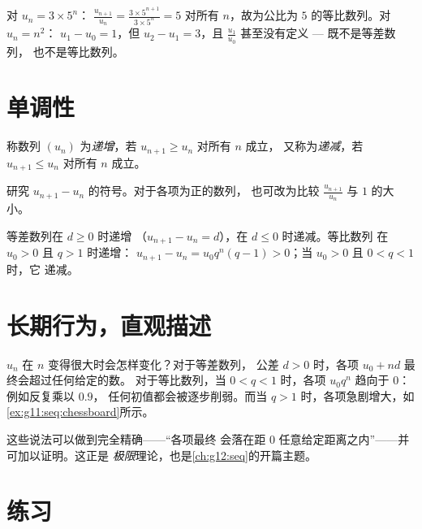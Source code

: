 \begin{example}
对 $u_n = 3 \times 5^n$：
$\frac{u_{n+1}}{u_n} = \frac{3 \times 5^{n+1}}{3 \times 5^n} = 5$ 对所有
$n$，故为公比为 $5$ 的等比数列。对 $u_n = n^2$：
$u_1 - u_0 = 1$，但 $u_2 - u_1 = 3$，且
$\frac{u_1}{u_0}$ 甚至没有定义 --- 既不是等差数列，
也不是等比数列。
\end{example}

\section{单调性}

\begin{definition}[单调数列]\label{def:g11:seq:monotone}
称数列 $(u_n)$ 为\emph{递增}，若 $u_{n+1} \geq u_n$ 对所有 $n$ 成立，
又称为\emph{递减}，若 $u_{n+1} \leq u_n$ 对所有 $n$ 成立。
\end{definition}

\begin{method}[研究单调性]\label{met:g11:seq:monotonicity}
研究 $u_{n+1} - u_n$ 的符号。对于各项为正的数列，
也可改为比较 $\frac{u_{n+1}}{u_n}$ 与 $1$ 的大小。
\end{method}

\begin{example}
等差数列在 $d \geq 0$ 时递增
（$u_{n+1} - u_n = d$），在 $d \leq 0$ 时递减。等比数列
在 $u_0 > 0$ 且 $q > 1$ 时递增：
$u_{n+1} - u_n = u_0 q^n (q - 1) > 0$；当 $u_0 > 0$ 且 $0 < q < 1$ 时，它
递减。
\end{example}

\section{长期行为，直观描述}

$u_n$ 在 $n$ 变得很大时会怎样变化？对于等差数列，
公差 $d > 0$ 时，各项 $u_0 + nd$ 最终会超过任何给定的数。
对于等比数列，当 $0 < q < 1$ 时，各项
$u_0 q^n$ 趋向于 $0$：例如反复乘以 $0.9$，
任何初值都会被逐步削弱。而当 $q > 1$ 时，各项急剧增大，如
\cref{ex:g11:seq:chessboard}所示。

\begin{remark}
这些说法可以做到完全精确——“各项最终
会落在距 $0$ 任意给定距离之内”——并可加以证明。这正是
\emph{极限}理论，也是\cref{ch:g12:seq}的开篇主题。
\end{remark}

\section{练习}

